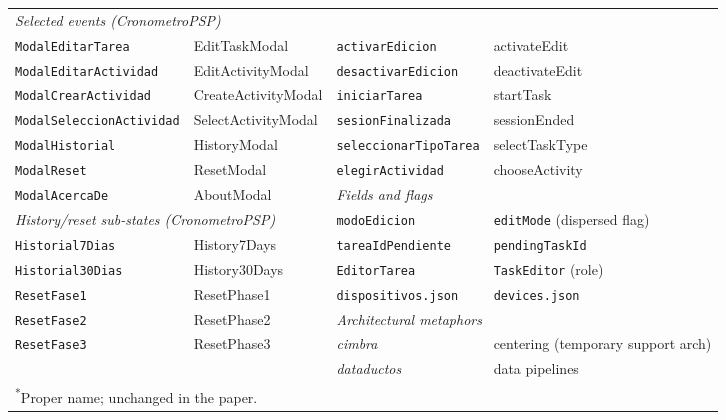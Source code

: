 \begin{table}[t]
\begin{tabular}{p{3.8cm}p{2.9cm}@{\hskip 1.5em\vrule\hskip 1.5em}p{3.8cm}p{2.9cm}}
    \multicolumn{2}{l}{\textit{Selected events (CronometroPSP)}} \\
    \texttt{Modal\-EditarTarea} & EditTaskModal &
    \texttt{activarEdicion}      & activateEdit \\
    \texttt{Modal\-EditarActividad} & EditActivityModal &
    \texttt{desactivarEdicion}   & deactivateEdit \\
    \texttt{Modal\-CrearActividad} & CreateActivityModal &
    \texttt{iniciarTarea}        & startTask \\
    \texttt{Modal\-SeleccionActividad} & SelectActivityModal &
    \texttt{sesionFinalizada}    & sessionEnded \\
    \texttt{ModalHistorial}  & HistoryModal &
    \texttt{seleccionarTipoTarea} & selectTaskType \\
    \texttt{ModalReset}      & ResetModal &
    \texttt{elegirActividad}     & chooseActivity \\
    \texttt{ModalAcercaDe}   & AboutModal &
    \multicolumn{2}{l}{\textit{Fields and flags}} \\
    \multicolumn{2}{l}{\textit{History/reset sub-states (CronometroPSP)}} &
    \texttt{modoEdicion}         & \texttt{editMode} (dispersed flag) \\
    \texttt{Historial7Dias}  & History7Days &
    \texttt{tareaIdPendiente}    & \texttt{pendingTaskId} \\
    \texttt{Historial30Dias} & History30Days &
    \texttt{EditorTarea}         & \texttt{TaskEditor} (role) \\
    \texttt{ResetFase1}      & ResetPhase1 &
    \texttt{dispositivos.json}   & \texttt{devices.json} \\
    \texttt{ResetFase2}      & ResetPhase2 &
    \multicolumn{2}{l}{\textit{Architectural metaphors}} \\
    \texttt{ResetFase3}      & ResetPhase3 &
    \textit{cimbra}              & centering (temporary support arch) \\
    & & \textit{dataductos}          & data pipelines \\
    \bottomrule
    \multicolumn{4}{l}{\textsuperscript{*}Proper name; unchanged in the paper.}
  \end{tabular}
\end{table}
